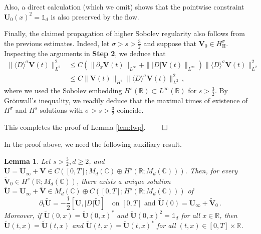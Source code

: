 \documentclass[11pt,reqno]{amsart}
\newtheorem{lem}{Lemma}[section]
\theoremstyle{definition}
\theoremstyle{remark}
\theoremstyle{remark}
\numberwithin{equation}{section}
\newcommand{\C}{\mathbb{C}}
\newcommand{\R}{\mathbb{R}}
\newcommand{\pt}{\partial}
\newcommand{\ii}{\mathrm{i}}
\newcommand{\Vb}{\mathbf{V}}
\newcommand{\Ub}{\mathbf{U}}
\newcommand{\Dsr}{\langle D \rangle}
\begin{document}
\begin{appendix}
Also, a direct calculation (which we omit) shows that the pointwise constraint $\Ub_0(x)^2 = \mathds{1}_d$ is also preserved by the flow.

Finally, the claimed propagation of higher Sobolev regularity also follows from the previous estimates. Indeed, let $\sigma > s > \frac{3}{2}$ and suppose that $\Vb_0 \in H^\sigma_{\mathrm{H}}$. Inspecting the arguments in \textbf{Step 2}, we deduce that
\begin{align*}
\| \Dsr^\sigma \Vb(t) \|_{L^2}^2 & \leq C \left ( \| \pt_x \Vb(t)\|_{L^\infty} + \| |D| \Vb(t) \|_{L^\infty} \right ) \| \Dsr^\sigma \Vb(t) \|_{L^2}^2 \\
& \leq C \| \Vb(t) \|_{H^{s}} \|\Dsr^\sigma \Vb(t) \|_{L^2}^2 \, ,
\end{align*}
where we used the Sobolev embedding $H^{s}(\R) \subset L^\infty(\R)$ for $s > \frac{3}{2}$. By Gr\"onwall's inequality, we readily deduce that the maximal times of existence of $H^\sigma$ and $H^s$-solutions with $\sigma > s > \frac{3}{2}$ coincide. 

This completes the proof of Lemma \ref{lem:lwp}. \hfill $\qed$

\medskip
In the proof above, we need the following auxiliary result.

\begin{lem} \label{lem:lwp2}
Let $s > \frac{3}{2}, d \geq 2$, and $\Ub = \Ub_\infty + \Vb \in C([0,T]; M_d(\C) \oplus H^s(\R; M_d(\C)))$. Then, for every $\widetilde{\Vb}_0 \in H^s(\R; M_d(\C))$, there exists a unique solution $\widetilde{\Ub} = \Ub_\infty + \widetilde{\Vb} \in M_d(\C) \oplus C([0,T]; H^s(\R; M_d(\C)))$ of
$$
\pt_t \widetilde{\Ub} = -\frac{\ii}{2} [ \Ub, |D| \widetilde{\Ub}] \quad \mbox{on $[0,T]$ and $\widetilde{\Ub}(0) = \Ub_\infty + \widetilde{\Vb}_0$} \, .
$$
Moreover, if $\widetilde{\Ub}(0,x)=\widetilde{\Ub}(0,x)^*$ and $\widetilde{\Ub}(0,x)^2=\mathds{1}_d$ for all $x \in \R$, then $\widetilde{\Ub}(t,x)= \widetilde{\Ub}(t,x)$ and $\widetilde{\Ub}(t,x) = \widetilde{\Ub}(t,x)^*$ for all $(t,x) \in [0,T] \times \R$. 
\end{lem}


\end{appendix}
\end{document}

